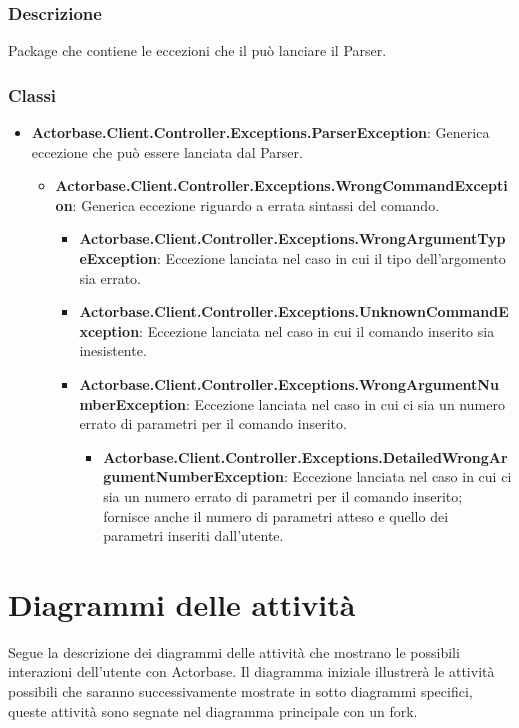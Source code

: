 \documentclass[a4paper]{article}
\begin{document}
			\subsubsection{Descrizione}
				Package che contiene le eccezioni che il può lanciare il Parser.
			\subsubsection{Classi}
				\begin{itemize}
					\item \textbf{Actorbase.Client.Controller.Exceptions.ParserException}:
						Generica eccezione che può essere lanciata dal Parser.
					\begin{itemize}
						\item \textbf{Actorbase.Client.Controller.Exceptions.WrongCommandException}:
							Generica eccezione riguardo a errata sintassi del comando.
						\begin{itemize}
							\item \textbf{Actorbase.Client.Controller.Exceptions.WrongArgumentTypeException}:
								Eccezione lanciata nel caso in cui il tipo dell'argomento sia errato.
							\item \textbf{Actorbase.Client.Controller.Exceptions.UnknownCommandException}:
								Eccezione lanciata nel caso in cui il comando inserito sia inesistente.
							\item \textbf{Actorbase.Client.Controller.Exceptions.WrongArgumentNumberException}:
								Eccezione lanciata nel caso in cui ci sia un numero errato di parametri per il comando inserito.
								\begin{itemize}
									\item \textbf{Actorbase.Client.Controller.Exceptions.DetailedWrongArgumentNumberException}:
										Eccezione lanciata nel caso in cui ci sia un numero errato di parametri per il comando inserito; fornisce anche il numero di parametri atteso e quello dei parametri inseriti dall'utente.
								\end{itemize}
						\end{itemize}						 
					\end{itemize}
				\end{itemize}
							 
	
	\newpage 
	\section{Diagrammi delle attività}
		Segue la descrizione dei diagrammi delle attività che mostrano le possibili interazioni dell'utente con Actorbase. Il diagramma iniziale illustrerà le attività possibili che saranno successivamente mostrate in sotto diagrammi specifici, queste attività sono segnate nel diagramma principale con un fork.
\end{document}
